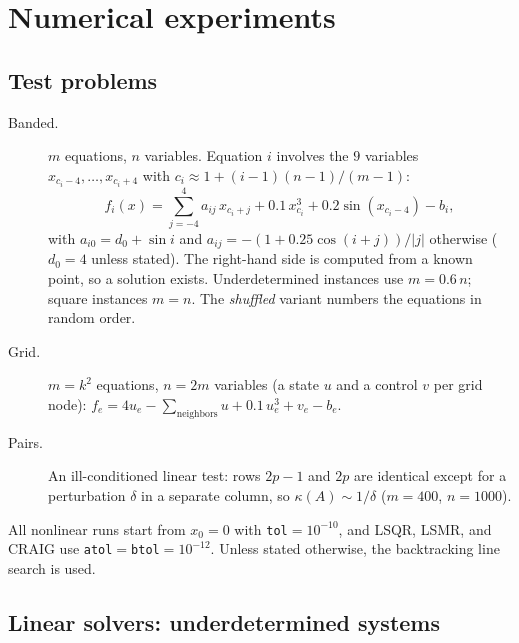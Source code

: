 \documentclass[11pt]{article}
\newcommand{\code}[1]{\texttt{#1}}
\newcommand{\cond}{\kappa}
\begin{document}
\section{Numerical experiments}
\label{sec:experiments}



\subsection{Test problems}
\label{sec:exp-problems}
\begin{description}
\item[Banded.] $m$ equations, $n$ variables. Equation $i$ involves the $9$ variables
$x_{c_i-4}, \ldots, x_{c_i+4}$ with $c_i \approx 1 + (i-1)(n-1)/(m-1)$:
\begin{equation}
  f_i(x) = \sum_{j=-4}^{4} a_{ij}\, x_{c_i+j} + 0.1\, x_{c_i}^3 + 0.2 \sin(x_{c_i-4}) - b_i ,
\end{equation}
with $a_{i0} = d_0 + \sin i$ and $a_{ij} = -(1 + 0.25\cos(i+j))/|j|$ otherwise ($d_0 = 4$ unless
stated). The right-hand side is computed from a known point, so a solution exists. Underdetermined
instances use $m = 0.6\,n$; square instances $m = n$. The \emph{shuffled} variant numbers the equations in
random order.
\item[Grid.] $m = k^2$ equations, $n = 2m$ variables (a state $u$ and a control $v$ per grid node):
$f_e = 4u_e - \sum_{\text{neighbors}} u + 0.1\, u_e^3 + v_e - b_e$.
\item[Pairs.] An ill-conditioned linear test: rows $2p-1$ and $2p$ are identical except for a
perturbation $\delta$ in a separate column, so $\cond(A) \sim 1/\delta$ ($m = 400$, $n = 1000$).
\end{description}
All nonlinear runs start from $x_0 = 0$ with \code{tol}${}=10^{-10}$, and LSQR, LSMR, and CRAIG use
\code{atol}${}=$\code{btol}${}=10^{-12}$. Unless stated otherwise, the backtracking line search is
used.

\subsection{Linear solvers: underdetermined systems}
\label{sec:exp-scaling}
\end{document}

